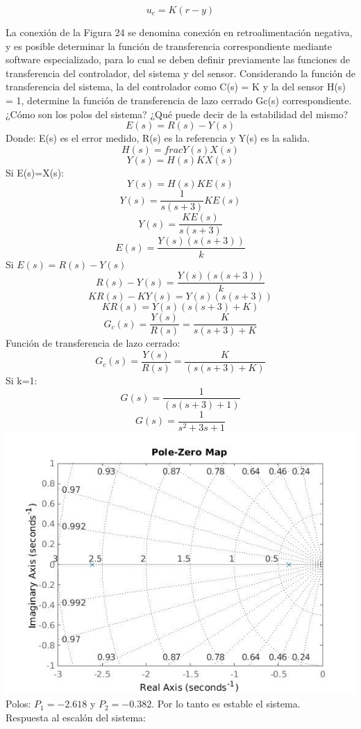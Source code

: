 \begin{equation*}
	u_c=K(r-y)
\end{equation*}

La conexión de la Figura 24 se denomina conexión en retroalimentación negativa, y es posible determinar la función de transferencia correspondiente mediante software especializado, para lo cual se deben definir
previamente las funciones de transferencia del controlador, del sistema y del sensor. Considerando la función de transferencia del sistema, la del controlador como C(s) = K y la del sensor H(s) = 1, determine
la función de transferencia de lazo cerrado Gc(s) correspondiente. ¿Cómo son los polos del sistema? ¿Qué puede decir de la estabilidad del mismo?
$$E(s)=R(s)-Y(s)$$
Donde: E(s) es el error medido, R(s) es la referencia y Y(s) es la salida.
$$H(s)=frac{Y(s)}{X(s)}$$
$$Y(s)=H(s)KX(s)$$
Si E(s)=X(s):
$$Y(s)=H(s)KE(s)$$
$$Y(s)=\frac{1}{s(s+3)}KE(s)$$
$$Y(s)=\frac{KE(s)}{s(s+3)}$$
$$E(s)=\frac{Y(s)(s(s+3))}{k}$$
Si $E(s)=R(s)-Y(s)$
$$R(s)-Y(s)=\frac{Y(s)(s(s+3))}{k}$$
$$KR(s)-KY(s)=Y(s)(s(s+3))$$
$$KR(s)=Y(s)(s(s+3)+K)$$
$$G_{c}(s)=\frac{Y(s)}{R(s)}=\frac{K}{s(s+3)+K}$$
Función de transferencia de lazo cerrado:
$$G_{c}(s)=\frac{Y(s)}{R(s)}=\frac{K}{(s(s+3)+K)}$$	
Si k=1:
$$G(s)=\frac{1}{(s(s+3)+1)}$$	
$$G(s)=\frac{1}{s^{2}+3s+1}$$	
\includegraphics[scale=0.5]{./img2/G3.jpg}\\ 
Polos: $P_{1}=-2.618$ y $P_{2}=-0.382$. Por lo tanto es estable el sistema.\\
Respuesta al escalón del sistema:\\
